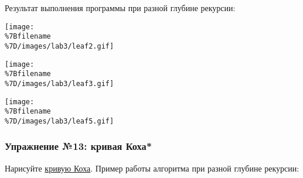 \begin{Shaded}
\begin{Highlighting}[]
 
     \OperatorTok{==} \NormalTok{:}
        \NormalTok{)}

    \OperatorTok{=} \OperatorTok{/}\NormalTok{)}
      
        \NormalTok{)}
        \OperatorTok{*}\OperatorTok{*}\OperatorTok{-}\OperatorTok{-}\NormalTok{)}
        \NormalTok{)}
        \OperatorTok{*}\OperatorTok{*}\OperatorTok{-}\OperatorTok{-}\NormalTok{)}
        \NormalTok{)}

    \NormalTok{)}

\NormalTok{, }\NormalTok{)}
\end{Highlighting}
\end{Shaded}

Результат выполнения программы при разной глубине рекурсии:

\texttt{[image: \\\%7Bfilename\\\%7D/images/lab3/leaf2.gif]}

\texttt{[image: \\\%7Bfilename\\\%7D/images/lab3/leaf3.gif]}

\texttt{[image: \\\%7Bfilename\\\%7D/images/lab3/leaf5.gif]}

\subsubsection{Упражнение №13: кривая
Коха*}\label{ux443ux43fux440ux430ux436ux43dux435ux43dux438ux435-13-ux43aux440ux438ux432ux430ux44f-ux43aux43eux445ux430}

Нарисуйте
\href{https://wikipedia.org/ru/\%D0\%9A\%D1\%80\%D0\%B8\%D0\%B2\%D0\%B0\%D1\%8F_\%D0\%9A\%D0\%BE\%D1\%85\%D0\%B0}{кривую
Коха}. Пример работы алгоритма при разной глубине рекурсии:

